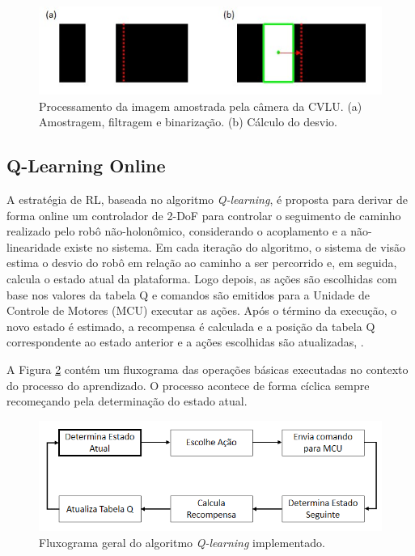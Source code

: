 \documentclass[a4paper]{ifacconf}
\begin{document}
\begin{figure}
\centering 
\includegraphics[scale=0.55]{Figuras/im_proc_lf.jpg} 
\caption{Processamento da imagem amostrada pela câmera da CVLU. (a) Amostragem, filtragem e binarização. (b) Cálculo do desvio.}
\label{fig:im_proc_lf}
\end{figure} 


\subsection{Q-Learning Online}
A estratégia de RL, baseada no algoritmo \emph{Q-learning}, é proposta para derivar de forma online um controlador de 2-DoF para controlar o seguimento de caminho realizado pelo robô não-holonômico, considerando o acoplamento e a não-linearidade existe no sistema. Em cada iteração do algoritmo, o sistema de visão  estima o desvio do robô em relação ao caminho a ser percorrido e, em seguida, calcula o estado atual da plataforma. Logo depois, as ações são escolhidas com base nos valores da tabela Q e comandos são emitidos para a Unidade de Controle de Motores (MCU) executar as ações. Após o término da execução, o novo estado é estimado, a recompensa é calculada e a posição da tabela Q correspondente ao estado anterior e a ações escolhidas são atualizadas, \citep{qLearningDev}. 

A Figura \ref{fig:qlearningflux} contém um fluxograma das operações básicas executadas no contexto do processo do aprendizado. O processo acontece de forma cíclica sempre recomeçando pela determinação do estado atual.

\begin{figure}
\centering  
\includegraphics[scale=0.5]{Figuras/qlearningflux.png}
\caption{Fluxograma geral do algoritmo \textit{Q-learning} implementado.}
\label{fig:qlearningflux}
\end{figure} 
\end{document}
